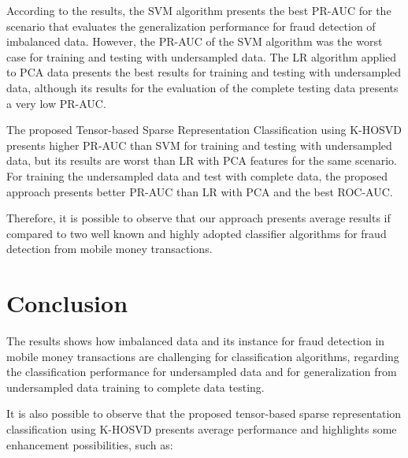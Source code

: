 According to the results, the SVM algorithm presents the best PR-AUC for the scenario that evaluates the generalization performance for fraud detection of imbalanced data. However, the PR-AUC of the SVM algorithm was the worst case for training and testing with undersampled data. The LR algorithm applied to PCA data presents the best results for training and testing with undersampled data, although its results for the evaluation of the complete testing data presents a very low PR-AUC. 

The proposed Tensor-based Sparse Representation Classification using K-HOSVD presents higher PR-AUC than SVM for training and testing with undersampled data, but its results are worst than LR with PCA features for the same scenario. For training the undersampled data and test with complete data, the proposed approach presents better PR-AUC than LR with PCA and the best ROC-AUC. 

Therefore, it is possible to observe that our approach presents average results if compared to two well known and highly adopted classifier algorithms for fraud detection from mobile money transactions.




\section{Conclusion}
\label{sec:4_conclusion}

The results shows how imbalanced data and its instance for fraud detection in mobile money transactions are challenging for classification algorithms, regarding the classification performance for undersampled data and for generalization from undersampled data training to complete data testing. 

It is also possible to observe that the proposed tensor-based sparse representation classification using K-HOSVD presents average performance and highlights some enhancement possibilities, such as:


